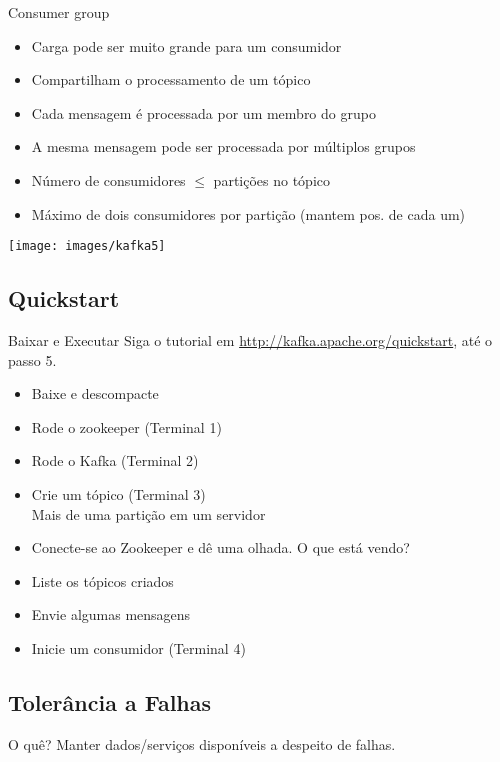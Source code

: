 \begin{frame}{Consumer group}
\begin{itemize}
	\item Carga pode ser muito grande para um consumidor
	\item Compartilham o processamento de um tópico
	\item Cada mensagem é processada por um membro do grupo
	\item A mesma mensagem pode ser processada por múltiplos grupos
	\item Número de consumidores $\leq$ partições no tópico
	\item Máximo de dois consumidores por partição (mantem pos. de cada um)
\end{itemize}

\texttt{[image: images/kafka5]}
\end{frame}

\subsection{Quickstart}

\begin{frame}{Baixar e Executar}
Siga o tutorial em \url{http://kafka.apache.org/quickstart}, até o passo 5.

\begin{itemize}
	\item Baixe e descompacte
	\item Rode o zookeeper (Terminal 1)
	\item Rode o Kafka (Terminal 2)
	\item Crie um tópico (Terminal 3)\\
		Mais de uma partição em um servidor
	\item \alert{Conecte-se ao Zookeeper e dê uma olhada. O que está vendo?}
	\item Liste os tópicos criados
	\item Envie algumas mensagens
	\item Inicie um consumidor (Terminal 4)
\end{itemize}
\end{frame}



\subsection{Tolerância a Falhas}
\begin{frame}{O quê?}
Manter dados/serviços disponíveis a despeito de falhas.
\end{frame}

